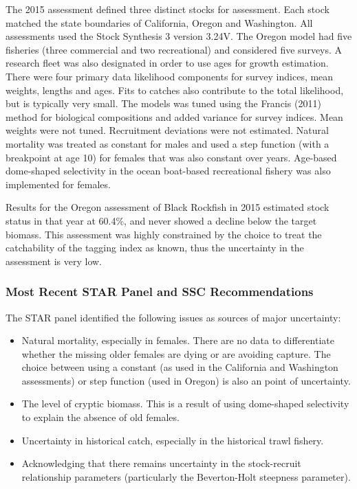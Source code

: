 \documentclass[11pt,
  english,
  letterpaper,
]{article}
\providecommand{\tightlist}{%
  \setlength{\itemsep}{0pt}\setlength{\parskip}{0pt}}
\providecommand{\tightlist}{%
  \setlength{\itemsep}{0pt}\setlength{\parskip}{0pt}}
\begin{document}
The 2015 assessment defined three distinct stocks for assessment. Each stock matched the state boundaries of California, Oregon and Washington. All assessments used the Stock Synthesis 3 version 3.24V. The Oregon model had five fisheries (three commercial and two recreational) and considered five surveys. A research fleet was also designated in order to use ages for growth estimation. There were four primary data likelihood components for survey indices, mean weights, lengths and ages. Fits to catches also contribute to the total likelihood, but is typically very small. The models was tuned using the Francis (2011) method for biological compositions and added variance for survey indices. Mean weights were not tuned. Recruitment deviations were not estimated. Natural mortality was treated as constant for males and used a step function (with a breakpoint at age 10) for females that was also constant over years. Age-based dome-shaped selectivity in the ocean boat-based recreational fishery was also implemented for females.

Results for the Oregon assessment of Black Rockfish in 2015 estimated stock status in that year at 60.4\%, and never showed a decline below the target biomass. This assessment was highly constrained by the choice to treat the catchability of the tagging index as known, thus the uncertainty in the assessment is very low.

\hypertarget{most-recent-star-panel-and-ssc-recommendations}{%
\subsubsection{Most Recent STAR Panel and SSC Recommendations}\label{most-recent-star-panel-and-ssc-recommendations}}

The STAR panel identified the following issues as sources of major uncertainty:

\begin{itemize}
\tightlist
\item
  Natural mortality, especially in females. There are no data to differentiate whether the missing older females are dying or are avoiding capture. The choice between using a constant (as used in the California and Washington assessments) or step function (used in Oregon) is also an point of uncertainty.
\item
  The level of cryptic biomass. This is a result of using dome-shaped selectivity to explain the absence of old females.
\item
  Uncertainty in historical catch, especially in the historical trawl fishery.
\item
  Acknowledging that there remains uncertainty in the stock-recruit relationship parameters (particularly the Beverton-Holt steepness parameter).
\end{itemize}
\end{document}
